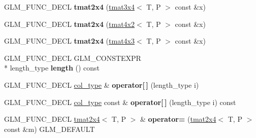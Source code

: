 \begin{DoxyCompactItemize}
\item 
\hypertarget{structglm_1_1tmat2x4_aff5a2bf784029b260a810cf84ff5f228}{G\-L\-M\-\_\-\-F\-U\-N\-C\-\_\-\-D\-E\-C\-L {\bfseries tmat2x4} (\hyperlink{structglm_1_1tmat3x4}{tmat3x4}$<$ T, P $>$ const \&x)}\label{structglm_1_1tmat2x4_aff5a2bf784029b260a810cf84ff5f228}

\item 
\hypertarget{structglm_1_1tmat2x4_a871b56fba1a79bfe5b48920c388ef607}{G\-L\-M\-\_\-\-F\-U\-N\-C\-\_\-\-D\-E\-C\-L {\bfseries tmat2x4} (\hyperlink{structglm_1_1tmat4x2}{tmat4x2}$<$ T, P $>$ const \&x)}\label{structglm_1_1tmat2x4_a871b56fba1a79bfe5b48920c388ef607}

\item 
\hypertarget{structglm_1_1tmat2x4_ae3ecb4edcc52b02b181e07a44d0511c8}{G\-L\-M\-\_\-\-F\-U\-N\-C\-\_\-\-D\-E\-C\-L {\bfseries tmat2x4} (\hyperlink{structglm_1_1tmat4x3}{tmat4x3}$<$ T, P $>$ const \&x)}\label{structglm_1_1tmat2x4_ae3ecb4edcc52b02b181e07a44d0511c8}

\item 
\hypertarget{structglm_1_1tmat2x4_a65ee7379c649596d8397b4070703ff44}{G\-L\-M\-\_\-\-F\-U\-N\-C\-\_\-\-D\-E\-C\-L G\-L\-M\-\_\-\-C\-O\-N\-S\-T\-E\-X\-P\-R \\*
length\-\_\-type {\bfseries length} () const }\label{structglm_1_1tmat2x4_a65ee7379c649596d8397b4070703ff44}

\item 
\hypertarget{structglm_1_1tmat2x4_a2bc91eaefd3d2fb68c70a5c0266f7be3}{G\-L\-M\-\_\-\-F\-U\-N\-C\-\_\-\-D\-E\-C\-L \hyperlink{structglm_1_1tvec4}{col\-\_\-type} \& {\bfseries operator\mbox{[}$\,$\mbox{]}} (length\-\_\-type i)}\label{structglm_1_1tmat2x4_a2bc91eaefd3d2fb68c70a5c0266f7be3}

\item 
\hypertarget{structglm_1_1tmat2x4_a9cb0ba95128c75266de5e54b3241695d}{G\-L\-M\-\_\-\-F\-U\-N\-C\-\_\-\-D\-E\-C\-L \hyperlink{structglm_1_1tvec4}{col\-\_\-type} const \& {\bfseries operator\mbox{[}$\,$\mbox{]}} (length\-\_\-type i) const }\label{structglm_1_1tmat2x4_a9cb0ba95128c75266de5e54b3241695d}

\item 
\hypertarget{structglm_1_1tmat2x4_a6b28f8306b71c409138050173a41dc7e}{G\-L\-M\-\_\-\-F\-U\-N\-C\-\_\-\-D\-E\-C\-L \hyperlink{structglm_1_1tmat2x4}{tmat2x4}$<$ T, P $>$ \& {\bfseries operator=} (\hyperlink{structglm_1_1tmat2x4}{tmat2x4}$<$ T, P $>$ const \&m) G\-L\-M\-\_\-\-D\-E\-F\-A\-U\-L\-T}\label{structglm_1_1tmat2x4_a6b28f8306b71c409138050173a41dc7e}


\end{DoxyCompactItemize}
